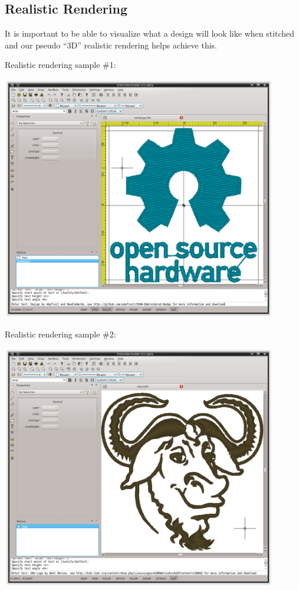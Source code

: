 \documentclass[a4paper, 11pt]{report}
\begin{document}
\subsection{Realistic Rendering}

It is important to be able to visualize what a design will look like when stitched and our pseudo ``3D'' realistic rendering helps achieve this.

Realistic rendering sample \#1:

\includegraphics[width=0.9\textwidth]{images/features-realrender-1.png}

Realistic rendering sample \#2:

\includegraphics[width=0.9\textwidth]{images/features-realrender-2.png}
\end{document}
